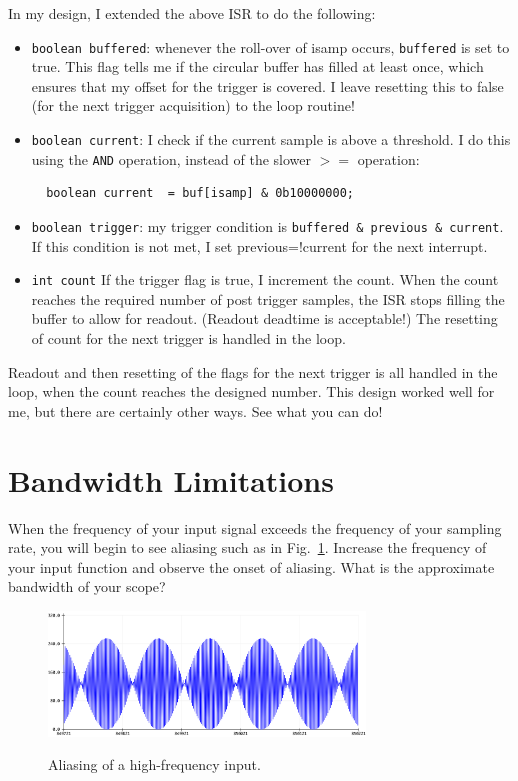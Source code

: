 \documentclass[12pt]{article}
\begin{document}
In my design, I extended the above ISR to do the following:
\begin{itemize}
\item {\tt boolean buffered}:  whenever the roll-over of isamp occurs, {\tt buffered} is set to true.   This flag tells me if the circular buffer has filled at least once, which ensures that my offset for the trigger is covered.
I leave resetting this to false (for the next trigger acquisition) to the loop routine!
\item {\tt boolean current}:  I check if the current sample is above a threshold.  I do this using the {\tt AND} operation, instead of the slower $>=$ operation:
\begin{verbatim}
  boolean current  = buf[isamp] & 0b10000000;
\end{verbatim} 
\item {\tt boolean trigger}: my trigger condition is  {\tt buffered \& previous \& current}.  If this condition is not met, I set previous=!current for the next interrupt.
\item {\tt int count} If the trigger flag is true, I increment the count.  When the count reaches the required number of post trigger samples, the ISR stops filling the buffer to allow for readout.  (Readout deadtime is acceptable!)  The resetting of count for the next trigger is handled in the loop.
\end{itemize} 
Readout and then resetting of the flags for the next trigger is all handled in the loop, when the count reaches the designed number.  This design worked well for me, but there are certainly other ways.  See what you can do!

\section{Bandwidth Limitations}

When the frequency of your input signal exceeds the frequency of your sampling rate, you will begin to see aliasing such as in Fig.~\ref{fig:aliasing}.  Increase the frequency of your input function and observe the onset of aliasing.  What is the approximate bandwidth of your scope? 
\begin{figure}[htbp]
\begin{center}
{\includegraphics[width=0.75\textwidth]{figs/aliasing.png}}
\end{center}
\caption{\label{fig:aliasing} Aliasing of a high-frequency input.}
\end{figure}
\end{document}
